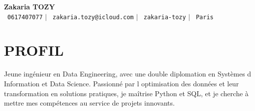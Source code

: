 \documentclass[letterpaper,11pt]{article}
\begin{document}
\begin{center}
    \textbf{\Huge Zakaria TOZY} \\ \vspace{5pt}
    \small \faPhone\ \texttt{0617407077} \hspace{1pt} $|$
    \hspace{1pt} \faEnvelope\ \texttt{zakaria.tozy@icloud.com} \hspace{1pt} $|$
    \hspace{1pt} \faLinkedin\ \texttt{zakaria-tozy} \hspace{1pt} $|$
    \hspace{1pt} \faMapMarker\ \texttt{Paris}
    \\ \vspace{-3pt}
\end{center}

\section{PROFIL}
\begin{itemize}[leftmargin=0in, label={}]
\small{\item{
Jeune ing\'{e}nieur en Data Engineering, avec une double diplomation en Syst\`{e}mes d Information et Data Science. Passionn\'{e} par l optimisation des donn\'{e}es et leur transformation en solutions pratiques, je ma\^{i}trise Python et SQL, et je cherche \`{a} mettre mes comp\'{e}tences au service de projets innovants.
}}
\end{itemize}
\end{document}
